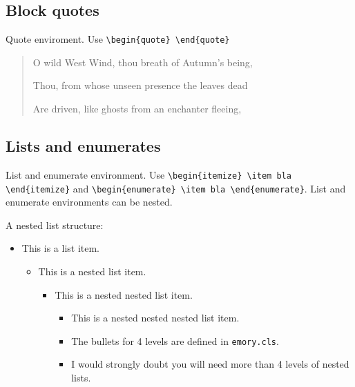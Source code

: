 \documentclass[draft]{emory}
\begin{document}
\subsection{Block quotes}
Quote enviroment. Use \Verb|\begin{quote} \end{quote}|

\begin{quote}\label{poet}
O wild West Wind, thou breath of Autumn’s being,

Thou, from whose unseen presence the leaves dead

Are driven, like ghosts from an enchanter fleeing,
\end{quote}

\subsection{Lists and enumerates}
List and enumerate environment. Use \Verb|\begin{itemize} \item bla \end{itemize}|
and \Verb|\begin{enumerate} \item bla \end{enumerate}|. List and enumerate environments
can be nested.

A nested list structure:
\begin{itemize}
  \item This is a list item.
  \begin{itemize}
    \item This is a nested list item.
    \begin{itemize}
      \item This is a nested nested list item.
      \begin{itemize}
        \item This is a nested nested nested list item. 
        \item The bullets for 4 levels are defined in \Verb|emory.cls|.
        \item I would strongly doubt you will need more than 4 levels of nested lists.
      \end{itemize}
    \end{itemize}
  \end{itemize}    
\end{itemize}
\end{document}
